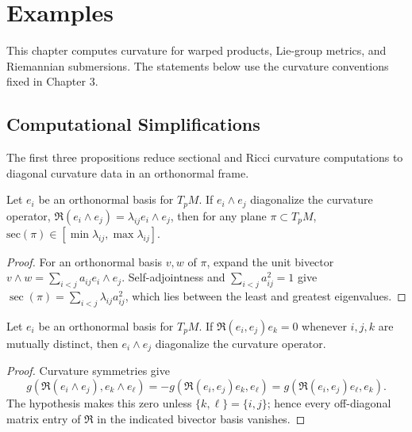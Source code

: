 \chapter{Examples}
\label{chap:pet-examples}

This chapter computes curvature for warped products, Lie-group metrics, and
Riemannian submersions. The statements below use the curvature conventions fixed
in Chapter 3.

\section{Computational Simplifications}

The first three propositions reduce sectional and Ricci curvature computations to
diagonal curvature data in an orthonormal frame.

\begin{proposition}
  \label{prop:pet-ch4-curvature-operator-diagonal-bounds}


  Let $e_i$ be an orthonormal basis for $T_pM$. If $e_i\wedge e_j$ diagonalize the
  curvature operator, $\mathfrak{R}(e_i\wedge e_j)=\lambda_{ij}e_i\wedge e_j$, then for any
  plane $\pi\subset T_pM$, $\mathrm{sec}(\pi)\in[\min\lambda_{ij},\max\lambda_{ij}]$.
\end{proposition}
\begin{proof}

  \sketch
  For an orthonormal basis $v,w$ of $\pi$, expand the unit bivector
  $v\wedge w=\sum_{i<j}a_{ij}e_i\wedge e_j$. Self-adjointness and
  $\sum_{i<j}a_{ij}^2=1$ give
  $\operatorname{sec}(\pi)=\sum_{i<j}\lambda_{ij}a_{ij}^2$, which lies between
  the least and greatest eigenvalues.
\end{proof}

\begin{proposition}
  \label{prop:pet-ch4-triple-vanishing-diagonalizes-operator}


  Let $e_i$ be an orthonormal basis for $T_pM$. If $\mathfrak{R}(e_i,e_j)e_k=0$ whenever
  $i,j,k$ are mutually distinct, then $e_i\wedge e_j$ diagonalize the curvature
  operator.
\end{proposition}
\begin{proof}

  \sketch
  Curvature symmetries give
  \[
    g(\mathfrak R(e_i\wedge e_j),e_k\wedge e_\ell)
    =-g(\mathfrak R(e_i,e_j)e_k,e_\ell)
    =g(\mathfrak R(e_i,e_j)e_\ell,e_k).
  \]
  The hypothesis makes this zero unless $\{k,\ell\}=\{i,j\}$; hence every
  off-diagonal matrix entry of $\mathfrak R$ in the indicated bivector basis
  vanishes.
\end{proof}

